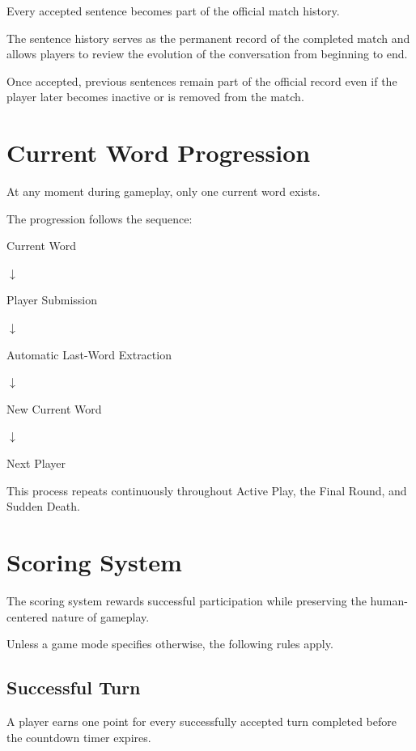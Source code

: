 \documentclass[11pt,a4paper]{article}
\begin{document}
Every accepted sentence becomes part of the official match history.

The sentence history serves as the permanent record of the completed match and allows players to review the evolution of the conversation from beginning to end.

Once accepted, previous sentences remain part of the official record even if the player later becomes inactive or is removed from the match.

\section{Current Word Progression}

At any moment during gameplay, only one current word exists.

The progression follows the sequence:

\begin{center}
Current Word

$\downarrow$

Player Submission

$\downarrow$

Automatic Last-Word Extraction

$\downarrow$

New Current Word

$\downarrow$

Next Player
\end{center}

This process repeats continuously throughout Active Play, the Final Round, and Sudden Death.

\section{Scoring System}

The scoring system rewards successful participation while preserving the human-centered nature of gameplay.

Unless a game mode specifies otherwise, the following rules apply.

\subsection{Successful Turn}

A player earns one point for every successfully accepted turn completed before the countdown timer expires.
\end{document}
